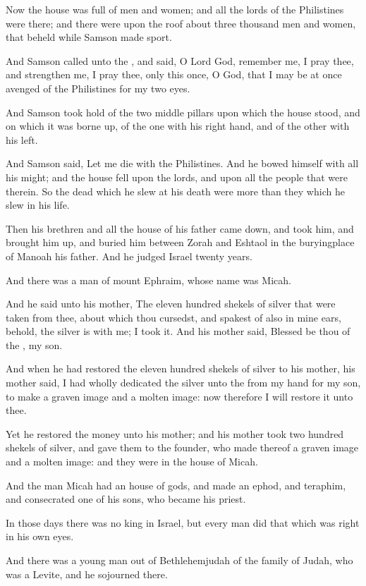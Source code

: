\Verse Now the house was full of men and women; and all the lords of the Philistines were there; and there were upon the roof about three thousand men and women, that beheld while Samson made sport.

\Verse And Samson called unto the \LORD, and said, O Lord God, remember me, I pray thee, and strengthen me, I pray thee, only this once, O God, that I may be at once avenged of the Philistines for my two eyes.

\Verse And Samson took hold of the two middle pillars upon which the house stood, and on which it was borne up, of the one with his right hand, and of the other with his left.

\Verse And Samson said, Let me die with the Philistines. And he bowed himself with all his might; and the house fell upon the lords, and upon all the people that were therein. So the dead which he slew at his death were more than they which he slew in his life.

\Verse Then his brethren and all the house of his father came down, and took him, and brought him up, and buried him between Zorah and Eshtaol in the buryingplace of Manoah his father. And he judged Israel twenty years.


\Chapter
\Verse And there was a man of mount Ephraim, whose name was Micah.

\Verse And he said unto his mother, The eleven hundred shekels of silver that were taken from thee, about which thou cursedst, and spakest of also in mine ears, behold, the silver is with me; I took it. And his mother said, Blessed be thou of the \LORD, my son.

\Verse And when he had restored the eleven hundred shekels of silver to his mother, his mother said, I had wholly dedicated the silver unto the \LORD from my hand for my son, to make a graven image and a molten image: now therefore I will restore it unto thee.

\Verse Yet he restored the money unto his mother; and his mother took two hundred shekels of silver, and gave them to the founder, who made thereof a graven image and a molten image: and they were in the house of Micah.

\Verse And the man Micah had an house of gods, and made an ephod, and teraphim, and consecrated one of his sons, who became his priest.

\Verse In those days there was no king in Israel, but every man did that which was right in his own eyes.

\Verse And there was a young man out of Bethlehemjudah of the family of Judah, who was a Levite, and he sojourned there.

